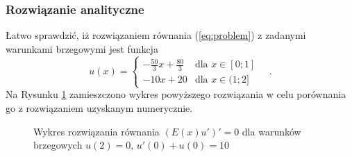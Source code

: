 \documentclass{myclass}
\begin{document}
\subsubsection*{Rozwiązanie analityczne}
Łatwo sprawdzić, iż rozwiązaniem równania (\ref{eq:problem}) z zadanymi
warunkami brzegowymi jest funkcja
\begin{equation}
    u(x) = \begin{cases}
        -\frac{50}{3} x + \frac{80}{3}&\text{dla \(x\in[0;1]\)}\\
        -10 x + 20&\text{dla \(x\in(1;2]\)}
    \end{cases}\quad.
\end{equation}
Na Rysunku \ref{fig:1} zamieszczono wykres powyższego rozwiązania w celu
porównania go z rozwiązaniem uzyskanym numerycznie.
\begin{figure}[ht]
    \centering

    \caption{Wykres rozwiązania równania \((E(x)u')'=0\) dla warunków brzegowych \(u(2)=0\), \(u'(0)+u(0)=10\)}

    \label{fig:1}
\end{figure}
\end{document}
